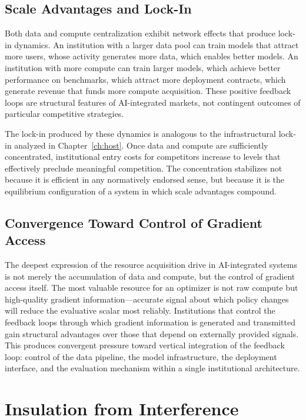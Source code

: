 \documentclass[12pt, oneside]{book}
\theoremstyle{plain}
\theoremstyle{definition}
\theoremstyle{remark}
\theoremstyle{definition}
\begin{document}
\section{Scale Advantages and Lock-In}

Both data and compute centralization exhibit network effects that produce
lock-in dynamics. An institution with a larger data pool can train models that
attract more users, whose activity generates more data, which enables better models.
An institution with more compute can train larger models, which achieve better
performance on benchmarks, which attract more deployment contracts, which generate
revenue that funds more compute acquisition. These positive feedback loops are
structural features of AI-integrated markets, not contingent outcomes of particular
competitive strategies.

The lock-in produced by these dynamics is analogous to the infrastructural lock-in
analyzed in Chapter~\ref{ch:host}. Once data and compute are sufficiently concentrated,
institutional entry costs for competitors increase to levels that effectively preclude
meaningful competition. The concentration stabilizes not because it is efficient in
any normatively endorsed sense, but because it is the equilibrium configuration of
a system in which scale advantages compound.

\section{Convergence Toward Control of Gradient Access}

The deepest expression of the resource acquisition drive in AI-integrated systems
is not merely the accumulation of data and compute, but the control of gradient
access itself. The most valuable resource for an optimizer is not raw compute but
high-quality gradient information---accurate signal about which policy changes will
reduce the evaluative scalar most reliably. Institutions that control the feedback
loops through which gradient information is generated and transmitted gain structural
advantages over those that depend on externally provided signals. This produces
convergent pressure toward vertical integration of the feedback loop: control of
the data pipeline, the model infrastructure, the deployment interface, and the
evaluation mechanism within a single institutional architecture.

\chapter{Insulation from Interference}
\label{ch:insulation}
\end{document}
